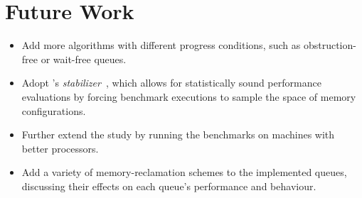 \section{Future Work}
\begin{itemize}
\item Add more algorithms with different progress conditions, such as
obstruction-free or wait-free queues.
\item Adopt \citeauthor{curtsinger2013stabilizer}'s \emph{stabilizer}~\citep{curtsinger2013stabilizer}, which allows
for statistically sound performance evaluations by forcing benchmark executions
to sample the space of memory configurations.
\item Further extend the study by running the benchmarks on machines with
better processors.
\item Add a variety of memory-reclamation schemes to the implemented queues,
discussing their effects on each queue's performance and behaviour.
\end{itemize}

